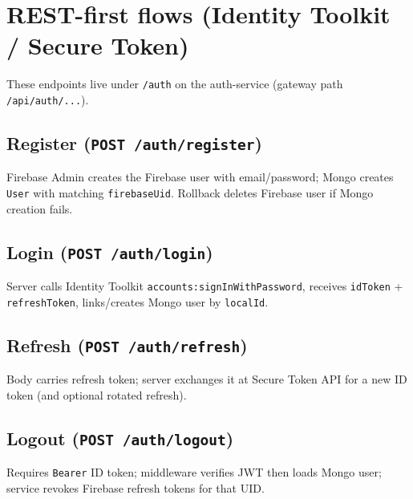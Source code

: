 \documentclass[11pt,a4paper]{article}
\begin{document}
\section{REST-first flows (Identity Toolkit / Secure Token)}

These endpoints live under \texttt{/auth} on the auth-service (gateway path \texttt{/api/auth/...}).

\subsection*{Register (\texttt{POST /auth/register})}
Firebase Admin creates the Firebase user with email/password; Mongo creates \texttt{User} with matching \texttt{firebaseUid}.
Rollback deletes Firebase user if Mongo creation fails.

\subsection*{Login (\texttt{POST /auth/login})}
Server calls Identity Toolkit \texttt{accounts:signInWithPassword}, receives \texttt{idToken} + \texttt{refreshToken},
links/creates Mongo user by \texttt{localId}.

\subsection*{Refresh (\texttt{POST /auth/refresh})}
Body carries refresh token; server exchanges it at Secure Token API for a new ID token (and optional rotated refresh).

\subsection*{Logout (\texttt{POST /auth/logout})}
Requires \texttt{Bearer} ID token; middleware verifies JWT then loads Mongo user; service revokes Firebase refresh tokens for that UID.
\end{document}
